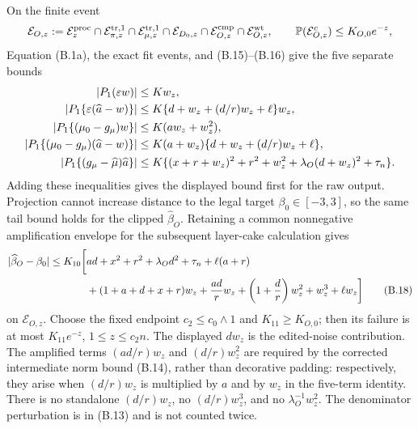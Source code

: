 On the finite event
\[
 \mathcal E_{O,z}:=
 \mathcal E_z^{\rm proc}\cap\mathcal E_{\pi,z}^{\rm tr,1}\cap
 \mathcal E_{\mu,z}^{\rm tr,1}\cap\mathcal E_{D_0,z}\cap
 \mathcal E_{O,z}^{\rm cmp}\cap\mathcal E_{O,z}^{\rm wt},
 \qquad \mathbb P(\mathcal E_{O,z}^c)\le K_{O,0}e^{-z},
\]
Equation (B.1a), the exact fit events, and (B.15)--(B.16) give the five
separate bounds
\begin{align*}
 \lvert P_1(\varepsilon w)\rvert&\le Kw_z,\\
 \lvert P_1\{\varepsilon(\widehat a-w)\}\rvert
   &\le K\{d+w_z+(d/r)w_z+\ell\}w_z,\\
 \lvert P_1\{(\mu_0-g_\mu)w\}\rvert
   &\le K(aw_z+w_z^2),\\
 \lvert P_1\{(\mu_0-g_\mu)(\widehat a-w)\}\rvert
   &\le K(a+w_z)\{d+w_z+(d/r)w_z+\ell\},\\
 \lvert P_1\{(g_\mu-\widehat\mu)\widehat a\}\rvert
   &\le K\{(x+r+w_z)^2+r^2+w_z^2
             +\lambda_O(d+w_z)^2+\tau_n\}.
\end{align*}
Adding these inequalities gives the displayed bound first for the raw output.
Projection cannot increase distance to the legal target
\(\beta_0\in[-3,3]\), so the same tail bound holds for the clipped
\(\widehat\beta_O\).  Retaining a common nonnegative amplification envelope
for the subsequent layer-cake calculation gives
\begin{align}
 \lvert \widehat\beta_O-\beta_0\rvert
 \le K_{10}\bigg[&ad+x^2+r^2+\lambda_Od^2+\tau_n+\ell(a+r)\nonumber\\
 &+(1+a+d+x+r)w_z+\frac{ad}{r}w_z
  +\left(1+\frac d r\right)w_z^2+w_z^3+\ell w_z\bigg]
 \tag{B.18}
\end{align}
on \(\mathcal E_{O,z}\).  Choose the fixed endpoint
\(c_2\le c_0\wedge1\) and \(K_{11}\ge K_{O,0}\); then its failure is at
most \(K_{11}e^{-z}\), \(1\le z\le c_2n\).
The displayed \(d w_z\) is the edited-noise contribution.  The amplified
terms \((ad/r)w_z\) and \((d/r)w_z^2\) are required by the corrected
intermediate norm bound (B.14), rather than decorative padding: respectively,
they arise when \((d/r)w_z\) is multiplied by \(a\) and by \(w_z\) in the
five-term identity.  There is no standalone \((d/r)w_z\), no
\((d/r)w_z^3\), and no \(\lambda_O^{-1}w_z^2\).  The denominator perturbation
is in (B.13) and is not counted twice.

